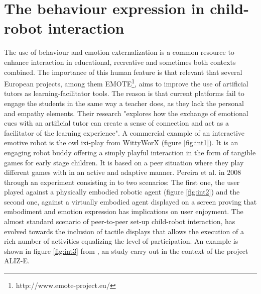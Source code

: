\section{The behaviour expression in child-robot interaction}

The use of behaviour and emotion externalization is a common resource to enhance interaction in educational, recreative and sometimes both contexts combined. The importance of this human feature is that relevant that several European projects, among them EMOTE\footnote{http://www.emote-project.eu/}, aims to improve the use of artificial tutors as learning-facilitator tools. The reason is that current platforms fail to engage the students in the same way a teacher does, as they lack the personal and empathy elements. Their research "explores how the exchange of emotional cues with an artificial tutor can create a sense of connection and act as a facilitator of the learning experience".
A commercial example of an interactive emotive robot is the owl ixi-play from WittyWorX (figure \ref{fig:int1}). It is an engaging robot buddy offering a simply playful interaction in the form of tangible games for early stage children. It is based on a peer situation where they play different games with in an active and adaptive manner. 
Pereira et al. in 2008 \cite{pereira2008icat} through an experiment consisting in to two scenarios: The first one, the user played against a physically embodied robotic agent (figure \ref{fig:int2}) and the second one, against a virtually embodied agent displayed on a screen proving that embodiment and emotion expression has implications on user enjoyment. 
The almost standard scenario of peer-to-peer set-up child-robot interaction, has evolved towards the inclusion of tactile displays that allows the execution of a rich number of activities equalizing the level of participation. An example is shown in figure \ref{fig:int3} from \cite{belpaeme2012multimodal}, an study carry out in the context of the project ALIZ-E.



